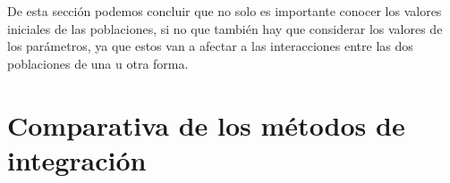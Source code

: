 \documentclass[11pt,a4paper]{article}
\begin{document}
De esta sección podemos concluir que no solo es importante conocer los valores iniciales de las
poblaciones, si no que también hay que considerar los valores de los parámetros, ya que estos van
a afectar a las interacciones entre las dos poblaciones de una u otra forma.

\section{Comparativa de los métodos de integración}
\end{document}
